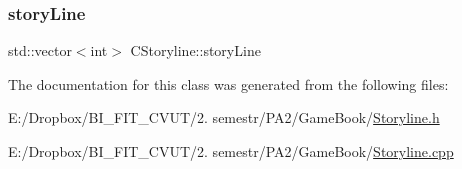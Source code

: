 \subsubsection{\texorpdfstring{story\+Line}{storyLine}}
{\footnotesize\ttfamily std\+::vector$<$int$>$ C\+Storyline\+::story\+Line\hspace{0.3cm}{\ttfamily [protected]}}



The documentation for this class was generated from the following files\+:\begin{DoxyCompactItemize}
\item 
E\+:/\+Dropbox/\+B\+I\+\_\+\+F\+I\+T\+\_\+\+C\+V\+U\+T/2. semestr/\+P\+A2/\+Game\+Book/\mbox{\hyperlink{_storyline_8h}{Storyline.\+h}}\item 
E\+:/\+Dropbox/\+B\+I\+\_\+\+F\+I\+T\+\_\+\+C\+V\+U\+T/2. semestr/\+P\+A2/\+Game\+Book/\mbox{\hyperlink{_storyline_8cpp}{Storyline.\+cpp}}\end{DoxyCompactItemize}
